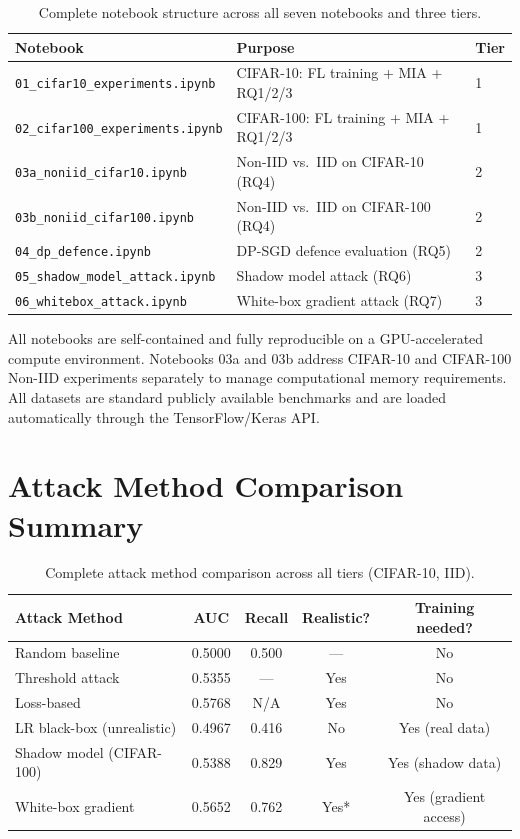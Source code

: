 \documentclass[12pt, a4paper]{report}
\begin{document}
\begin{table}[H]
  \centering
  \caption{Complete notebook structure across all seven notebooks and three tiers.}
  \begin{tabular}{lp{8cm}l}
    \toprule
    \textbf{Notebook} & \textbf{Purpose} & \textbf{Tier} \\
    \midrule
    \texttt{01\_cifar10\_experiments.ipynb}  & CIFAR-10: FL training + MIA + RQ1/2/3 & 1 \\
    \texttt{02\_cifar100\_experiments.ipynb} & CIFAR-100: FL training + MIA + RQ1/2/3 & 1 \\
    \texttt{03a\_noniid\_cifar10.ipynb}      & Non-IID vs.\ IID on CIFAR-10 (RQ4) & 2 \\
    \texttt{03b\_noniid\_cifar100.ipynb}     & Non-IID vs.\ IID on CIFAR-100 (RQ4) & 2 \\
    \texttt{04\_dp\_defence.ipynb}           & DP-SGD defence evaluation (RQ5) & 2 \\
    \texttt{05\_shadow\_model\_attack.ipynb} & Shadow model attack (RQ6) & 3 \\
    \texttt{06\_whitebox\_attack.ipynb}      & White-box gradient attack (RQ7) & 3 \\
    \bottomrule
  \end{tabular}
\end{table}

\noindent All notebooks are self-contained and fully reproducible on a
GPU-accelerated compute environment. Notebooks 03a and 03b address CIFAR-10
and CIFAR-100 Non-IID experiments separately to manage computational memory
requirements. All datasets are standard publicly available benchmarks and
are loaded automatically through the TensorFlow/Keras API.

\chapter{Attack Method Comparison Summary}
\label{app:attack_comparison}

\begin{table}[H]
  \centering
  \caption{Complete attack method comparison across all tiers (CIFAR-10, IID).}
  \begin{tabular}{lcccc}
    \toprule
    \textbf{Attack Method} & \textbf{AUC} & \textbf{Recall} & \textbf{Realistic?} & \textbf{Training needed?} \\
    \midrule
    Random baseline              & 0.5000 & 0.500 & ---  & No \\
    Threshold attack             & 0.5355 & ---   & Yes  & No \\
    Loss-based                   & 0.5768 & N/A   & Yes  & No \\
    LR black-box (unrealistic)   & 0.4967 & 0.416 & No   & Yes (real data) \\
    Shadow model (CIFAR-100)     & 0.5388 & 0.829 & Yes  & Yes (shadow data) \\
    White-box gradient           & 0.5652 & 0.762 & Yes* & Yes (gradient access) \\
    \bottomrule
  \end{tabular}
\end{table}
\end{document}
